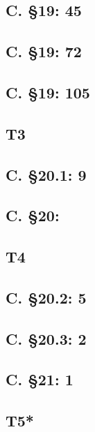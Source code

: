 \documentclass{article}
\begin{document}
\subsection{C. \S19: 45}
\subsection{C. \S19: 72}
\subsection{C. \S19: 105}
\subsection{T3}
\subsection{C. \S20.1: 9}
\subsection{C. \S20:}
\subsection{T4}
\subsection{C. \S20.2: 5}
\subsection{C. \S20.3: 2}
\subsection{C. \S21: 1}
\subsection{T5*}
\end{document}
